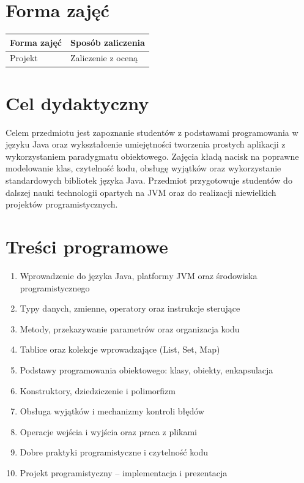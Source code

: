 \documentclass[12pt, a4paper]{article}
\begin{document}
\section{Forma zajęć}

\begin{tabular}{ll}
  \hline
  \textbf{Forma zajęć} & \textbf{Sposób zaliczenia} \\
  \hline
  Projekt & Zaliczenie z oceną \\
  \hline
\end{tabular}

\section{Cel dydaktyczny}

Celem przedmiotu jest zapoznanie studentów z podstawami programowania w języku Java oraz wykształcenie umiejętności tworzenia prostych aplikacji z wykorzystaniem paradygmatu obiektowego. Zajęcia kładą nacisk na poprawne modelowanie klas, czytelność kodu, obsługę wyjątków oraz wykorzystanie standardowych bibliotek języka Java. Przedmiot przygotowuje studentów do dalszej nauki technologii opartych na JVM oraz do realizacji niewielkich projektów programistycznych.

\section{Treści programowe}

\begin{enumerate}
  \item Wprowadzenie do języka Java, platformy JVM oraz środowiska programistycznego
  \item Typy danych, zmienne, operatory oraz instrukcje sterujące
  \item Metody, przekazywanie parametrów oraz organizacja kodu
  \item Tablice oraz kolekcje wprowadzające (List, Set, Map)
  \item Podstawy programowania obiektowego: klasy, obiekty, enkapsulacja
  \item Konstruktory, dziedziczenie i polimorfizm
  \item Obsługa wyjątków i mechanizmy kontroli błędów
  \item Operacje wejścia i wyjścia oraz praca z plikami
  \item Dobre praktyki programistyczne i czytelność kodu
  \item Projekt programistyczny – implementacja i prezentacja
\end{enumerate}
\end{document}
